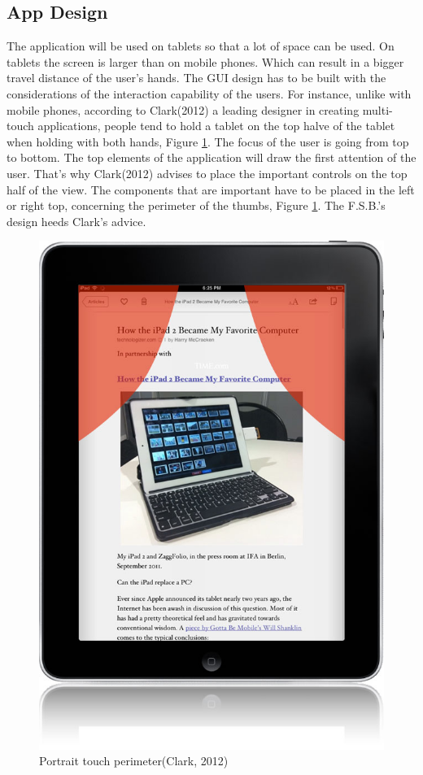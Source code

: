 \subsection{App Design} 
\label{sec:appdesign}
The application will be used on tablets so that a lot of space can be used. On tablets the screen is larger than on mobile phones. Which can result in a bigger travel distance of the user's hands. The GUI design has to be built with the considerations of the interaction capability of the users. For instance, unlike with mobile phones, according to Clark(2012) a leading designer in creating multi-touch applications, people tend to hold a tablet on the top halve of the tablet when holding with both hands, Figure \ref{fig:perimeter}. The focus of the user is going from top to bottom. The top elements of the application will draw the first attention of the user. That's why Clark(2012) advises to place the important controls on the top half of the view. The components that are important have to be placed in the left or right top, concerning the perimeter of the thumbs, Figure \ref{fig:perimeter}. The F.S.B.'s design heeds Clark's advice.
\begin{figure}[H]
\center
\includegraphics[scale=0.3]{touch.png}
\caption{Portrait touch perimeter(Clark, 2012)}
\label{fig:perimeter}
\end{figure}

